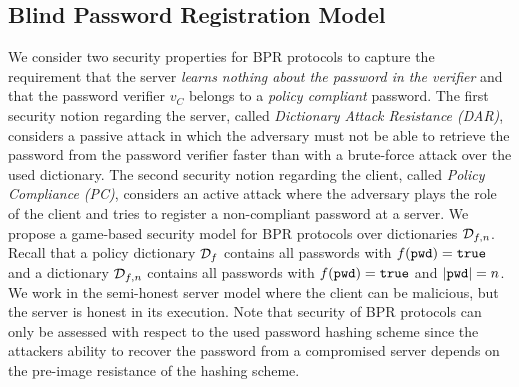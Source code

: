 \subsection{Blind Password Registration Model} \label{sec:bpr-model}
We consider two security properties for BPR protocols to capture the requirement that the server \emph{learns nothing about the password in the verifier} and that the password verifier $v_C$ belongs to a \emph{policy compliant} password.
The first security notion regarding the server, called \emph{Dictionary Attack Resistance (DAR)}, considers a passive attack in which the adversary must not be able to retrieve the password from the password verifier faster than with a brute-force attack over the used dictionary.
The second security notion regarding the client, called \emph{Policy Compliance (PC)}, considers an active attack where the adversary plays the role of the client and tries to register a non-compliant password at a server.
We propose a game-based security model for BPR protocols over dictionaries $\mathcal{D}_{f,n}$.
Recall that a policy dictionary $\mathcal{D}_f$ contains all passwords \pwd with $f(\mathtt{pwd})=\mathtt{true}$ and a dictionary $\mathcal{D}_{f,n}$ contains all passwords \pwd with $f(\mathtt{pwd})=\mathtt{true}$ and $|\mathtt{pwd}|=n$.
We work in the semi-honest server model where the client can be malicious, but the server is honest in its execution.
Note that security of BPR protocols can only be assessed with respect to the used password hashing scheme \HashP since the attackers ability to recover the password from a compromised server depends on the pre-image resistance of the hashing scheme.

